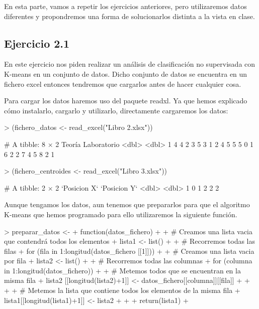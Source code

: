 \documentclass[parskip=full]{scrartcl}
\begin{document}
En esta parte, vamos a repetir los ejercicios anteriores, pero utilizaremos datos diferentes y propondremos una forma de solucionarlos distinta a la vista en clase.

\subsection{Ejercicio 2.1}

En este ejercicio nos piden realizar un análisis de clasificación no supervisada con K-means en un conjunto de datos. Dicho conjunto de datos se encuentra en un fichero excel entonces tendremos que cargarlos antes de hacer cualquier cosa.

Para cargar los datos haremos uso del paquete readxl. Ya que hemos explicado cómo instalarlo, cargarlo y utilizarlo, directamente cargaremos los datos:


\begin{Schunk}
\begin{Sinput}
> (fichero_datos <- read_excel("Libro 2.xlsx"))
\end{Sinput}
\begin{Soutput}
# A tibble: 8 × 2
  Teoría Laboratorio
   <dbl>       <dbl>
1      4           4
2      3           5
3      1           2
4      5           5
5      0           1
6      2           2
7      4           5
8      2           1
\end{Soutput}
\begin{Sinput}
> (fichero_centroides <- read_excel("Libro 3.xlsx"))
\end{Sinput}
\begin{Soutput}
# A tibble: 2 × 2
  `Posicion X` `Posicion Y`
         <dbl>        <dbl>
1            0            1
2            2            2
\end{Soutput}
\end{Schunk}


Aunque tengamos los datos, aun tenemos que prepararlos para que el algoritmo K-means que hemos programado para ello utilizaremos la siguiente función.


\begin{Schunk}
\begin{Sinput}
> preparar_datos <-
+ function(datos_fichero){
+ 
+ # Creamos una lista vacia que contendrá todos los elementos
+ lista1 <- list()
+ 
+ # Recorremos todas las filas
+ for (fila in 1:longitud(datos_fichero [[1]])){
+   
+   # Creamos una lista vacia por fila
+   lista2 <- list()
+   
+   # Recorremos todas las columnas
+   for (columna in 1:longitud(datos_fichero)){
+     
+     # Metemos todos que se encuentran en la misma fila
+     lista2 [[longitud(lista2)+1]] <- datos_fichero[[columna]][[fila]]
+     
+   }
+   
+   # Metemos la lista que contiene todos los elementos de la misma fila
+   lista1[[longitud(lista1)+1]] <- lista2
+ }
+ 
+ return(lista1)
+ }
\end{Sinput}
\end{Schunk}
\end{document}
